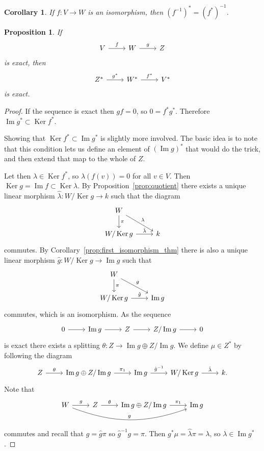 \documentclass[11pt]{article}
\newtheorem{prop}[theo]{Proposition}
\newtheorem{coro}[theo]{Corollary}
\theoremstyle{definition}
\DeclareMathOperator{\Ker}{Ker}
\DeclareMathOperator{\Img}{Im}
\begin{document}
\begin{coro}
If $f : V \to W$ is an isomorphism, then $(f^{-1})^* = (f^*)^{-1}$.
\end{coro}



\begin{prop}
If
\[
\begin{tikzcd}
V \ar[r,"f"] & W \ar[r,"g"] & Z
\end{tikzcd}
\]
is exact, then
\[
\begin{tikzcd}
Z^* \ar[r,"g^*"] & W^* \ar[r,"f^*"] & V^*
\end{tikzcd}
\]
is exact.
\end{prop}

\begin{proof}
If the sequence is exact then $gf = 0$, so $0 = f^* g^*$.
Therefore $\Img g^* \subset \Ker f^*$.

Showing that $\Ker f^* \subset \Img g^*$ is slightly more involved.
The basic idea is to note that this condition lets us define an element of $(\Img g)^*$ that would do the trick, and then extend that map to the whole of $Z$.

Let then $\lambda \in \Ker f^*$, so $\lambda(f(v)) = 0$ for all $v \in V$.
Then $\Ker g = \Img f \subset \Ker \lambda$.
By Proposition~\ref{prop:quotient} there exists a unique linear morphism $\hat \lambda : W/\Ker g \to k$ such that the diagram
\[
\begin{tikzcd}
W \ar[dr,"\lambda"] \ar[d,"\pi"] &
\\
W / \Ker g \ar[r,"\hat\lambda"] & k
\end{tikzcd}
\]
commutes.
By Corollary~\ref{prop:first_isomorphism_thm} there is also a unique linear morphism $\hat g : W / \Ker g \to \Img g$ such that
\[
\begin{tikzcd}
W \ar[dr,"g"] \ar[d,"\pi"] &
\\
W / \Ker g \ar[r,"\hat g"] & \Img g
\end{tikzcd}
\]
commutes, which is an isomorphism.
As the sequence
\[
\begin{tikzcd}
0 \ar[r] & \Img g \ar[r] & Z \ar[r] & Z / \Img g \ar[r] & 0
\end{tikzcd}
\]
is exact there exists a splitting $\theta : Z \to \Img g \oplus Z / \Img g$.
We define $\mu \in Z^*$ by following the diagram
\[
\begin{tikzcd}
Z \ar[r,"\theta"] &
\Img g \oplus Z / \Img g \ar[r,"\pi_1"] &
\Img g \ar[r,"{\hat g}^{-1}"] &
W / \Ker g \ar[r,"\hat \lambda"] &
k.
\end{tikzcd}
\]
Note that
\[
\begin{tikzcd}
W \ar[r,"g"] \ar[rrr,"g",bend right=20] &
Z \ar[r,"\theta"] &
\Img g \oplus Z / \Img g \ar[r,"\pi_1"] &
\Img g
\end{tikzcd}
\]
commutes and recall that $g = \hat g \pi$ so ${\hat g}^{-1} g = \pi$.
Then $g^* \mu = \hat \lambda \pi = \lambda$, so $\lambda \in \Img g^*$.
\end{proof}
\end{document}
